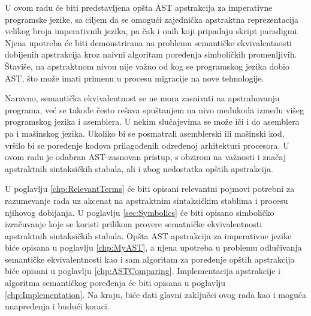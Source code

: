 U ovom radu će biti predstavljena opšta AST apstrakcija za imperativne programske jezike, sa ciljem da se omogući zajednička apstraktna reprezentacija velikog broja imperativnih jezika, pa čak i onih koji pripadaju skript paradigmi. Njena upotreba će biti demonstrirana na problemu semantičke ekvivalentnosti dobijenih apstrakcija kroz naivni algoritam poređenja simboličkih promenljivih. Štaviše, na apstraktnom nivou nije važno od kog se programskog jezika dobio AST, što može imati primenu u procesu migracije na nove tehnologije.

Naravno, semantička ekvivalentnost se ne mora zasnivati na apstrahovanju programa, već se takođe često rešava spuštanjem na nivo međukoda između višeg programskog jezika i asemblera. U nekim slučajevima se može iči i do asemblera pa i mašinskog jezika. Ukoliko bi se posmatrali asemblerski ili mašinski kod, vršilo bi se poređenje kodova prilagođenih određenoj arhitekturi procesora. U ovom radu je odabran AST-zasnovan pristup, s obzirom na važnosti i značaj apstraktnih sintaksičkih stabala, ali i zbog nedostatka opštih apstrakcija.

U poglavlju \ref{chp:RelevantTerms} će biti opisani relevantni pojmovi potrebni za razumevanje rada uz akcenat na apstraktnim sintaksičkim stablima i procesu njihovog dobijanja. U poglavlju \ref{sec:Symbolics} će biti opisano simboličko izračuvanje koje se koristi prilikom provere sematničke ekvivalentnosti apstraktnih sintaksičkih stabala. Opšta AST apstrakcija za imperativne jezike biće opisana u poglavlju \ref{chp:MyAST}, a njena upotreba u problemu odlučivanja semantičke ekvivalentnosti kao i sam algoritam za poređenje opštih apstrakcija biće opisani u poglavlju \ref{chp:ASTComparing}. Implementacija apstrakcije i algoritma semantičkog poređenja će biti opisana u poglavlju \ref{chp:Implementation}. Na kraju, biće dati glavni zaključci ovog rada kao i moguća unapređenja i budući koraci. 

